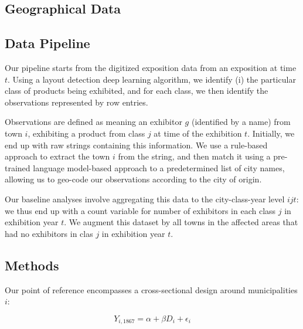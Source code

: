 \subsection{Geographical Data}

\subsection{Data Pipeline}



Our pipeline starts from the digitized exposition data from an exposition at time $t$. Using a layout detection deep learning algorithm, we identify (i) the particular class of products being exhibited, and for each class, we then identify the observations represented by row entries. 

Observations are defined as meaning an exhibitor $g$ (identified by a name) from town $i$, exhibiting a product from class $j$ at time of the exhibition $t$. Initially, we end up with raw strings containing this information. We use a rule-based approach to extract the town $i$ from the string, and then match it using a pre-trained language model-based approach to a predetermined list of city names, allowing us to geo-code our observations according to the city of origin. 

Our baseline analyses involve aggregating this data to the city-class-year level $ijt$: we thus end up with a count variable for number of exhibitors in each class $j$ in exhibition year $t$. We augment this dataset by all towns in the affected areas that had no exhibitors in clas $j$ in exhibition year $t$. 


\subsection{Methods}



Our point of reference encompasses a cross-sectional design around municipalities $i$:

\begin{equation*}
    Y_{i, 1867} = \alpha + \beta D_i + \epsilon_i 
\end{equation*}


